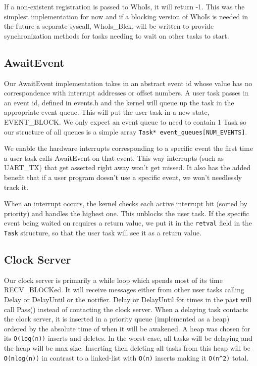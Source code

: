 \documentclass[letterpaper]{article}
\begin{document}
If a non-existent registration is passed to WhoIs, it will return -1. This was the simplest implementation for now and if a blocking version of WhoIs is needed in the future a separate syscall, WhoIs\_Blck, will be written to provide synchronization methods for tasks needing to wait on other tasks to start.

\subsection{AwaitEvent}

Our AwaitEvent implementation takes in an abstract event id whose value has no correspondence with interrupt addresses or offset numbers. A user task passes in an event id, defined in events.h and the kernel will queue up the task in the appropriate event queue. This will put the user task in a new state, EVENT\_BLOCK. We only expect an event queue to need to contain 1 Task so our structure of all queues is a simple array \verb!Task* event_queues[NUM_EVENTS]!.

We enable the hardware interrupts corresponding to a specific event the first time a user task calls AwaitEvent on that event. This way interrupts (such as UART\_TX) that get asserted right away won't get missed. It also has the added benefit that if a user program doesn't use a specific event, we won't needlessly track it.

When an interrupt occurs, the kernel checks each active interrupt bit (sorted by priority) and handles the highest one. This unblocks the user task. If the specific event being waited on requires a return value, we put it in the \verb!retval! field in the \verb!Task! structure, so that the user task will see it as a return value.

\subsection{Clock Server}

Our clock server is primarily a while loop which spends most of its time RECV\_BLOCKed. It will receive messages either from other user tasks calling Delay or DelayUntil or the notifier. Delay or DelayUntil for times in the past will call Pass() instead of contacting the clock server. When a delaying task contacts the clock server, it is inserted in a priority queue (implemented as a heap) ordered by the absolute time of when it will be awakened. A heap was chosen for its \verb!O(log(n))! inserts and deletes. In the worst case, all tasks will be delaying and the heap will be max size. Inserting then deleting all tasks from this heap will be \verb!O(nlog(n))! in contrast to a linked-list with \verb!O(n)! inserts making it \verb!O(n^2)! total.
\end{document}
